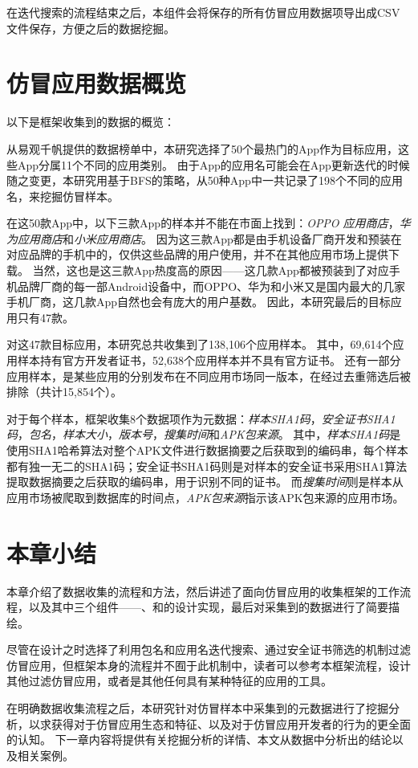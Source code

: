 在迭代搜索的流程结束之后，本组件会将保存的所有仿冒应用数据项导出成CSV文件保存，方便之后的数据挖掘。


\section{仿冒应用数据概览}
以下是框架收集到的数据的概览：

从易观千帆提供的数据榜单中，本研究选择了50个最热门的App作为目标应用，这些App分属11个不同的应用类别。
由于App的应用名可能会在App更新迭代的时候随之变更，本研究用基于BFS的策略，从50种App中一共记录了198个不同的应用名，来挖掘仿冒样本。

在这50款App中，以下三款App的样本并不能在市面上找到：\emph{OPPO 应用商店}，\emph{华为应用商店}和\emph{小米应用商店}。
因为这三款App都是由手机设备厂商开发和预装在对应品牌的手机中的，仅供这些品牌的用户使用，并不在其他应用市场上提供下载。
当然，这也是这三款App热度高的原因——这几款App都被预装到了对应手机品牌厂商的每一部Android设备中，而OPPO、华为和小米又是国内最大的几家手机厂商，这几款App自然也会有庞大的用户基数。
因此，本研究最后的目标应用只有47款。

对这47款目标应用，本研究总共收集到了138,106个应用样本。
其中，69,614个应用样本持有官方开发者证书，52,638个应用样本并不具有官方证书。
还有一部分应用样本，是某些应用的分别发布在不同应用市场同一版本，在经过去重筛选后被排除（共计15,854个）。

对于每个样本，框架收集8个数据项作为元数据：\emph{样本SHA1码}，\emph{安全证书SHA1码}，\emph{包名}，\emph{样本大小}，\emph{版本号}，\emph{搜集时间}和\emph{APK包来源}。
其中，\emph{样本SHA1码}是使用SHA1哈希算法对整个APK文件进行数据摘要之后获取到的编码串，每个样本都有独一无二的SHA1码；安全证书SHA1码则是对样本的安全证书采用SHA1算法提取数据摘要之后获取的编码串，用于识别不同的证书。
而\emph{搜集时间}则是样本从应用市场被爬取到数据库的时间点，\emph{APK包来源}指示该APK包来源的应用市场。


\section{本章小结}
本章介绍了数据收集的流程和方法，然后讲述了面向仿冒应用的收集框架\mytool 的工作流程，以及其中三个组件——\componentA 、\componentB 和\componentC 的设计实现，最后对采集到的数据进行了简要描绘。

尽管\mytool 在设计之时选择了利用包名和应用名迭代搜索、通过安全证书筛选的机制过滤仿冒应用，但框架本身的流程并不囿于此机制中，读者可以参考本框架流程，设计其他过滤仿冒应用，或者是其他任何具有某种特征的应用的工具。

在明确数据收集流程之后，本研究针对仿冒样本中采集到的元数据进行了挖掘分析，以求获得对于仿冒应用生态和特征、以及对于仿冒应用开发者的行为的更全面的认知。
下一章内容将提供有关挖掘分析的详情、本文从数据中分析出的结论以及相关案例。

